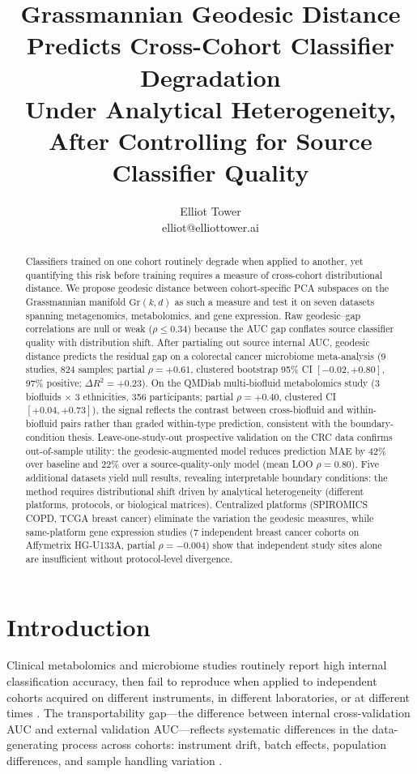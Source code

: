 \documentclass{article}
\title{Grassmannian Geodesic Distance Predicts Cross-Cohort Classifier Degradation\\Under Analytical Heterogeneity, After Controlling for Source Classifier Quality}
\author{\name Elliot Tower \\
      \email elliot@elliottower.ai}
\begin{document}
\maketitle

\begin{abstract}
Classifiers trained on one cohort routinely degrade when applied to another, yet quantifying this risk before training requires a measure of cross-cohort distributional distance. We propose geodesic distance between cohort-specific PCA subspaces on the Grassmannian manifold $\mathrm{Gr}(k, d)$ as such a measure and test it on seven datasets spanning metagenomics, metabolomics, and gene expression. Raw geodesic--gap correlations are null or weak ($\rho \leq 0.34$) because the AUC gap conflates source classifier quality with distribution shift. After partialing out source internal AUC, geodesic distance predicts the residual gap on a colorectal cancer microbiome meta-analysis (9 studies, 824 samples; partial $\rho = +0.61$, clustered bootstrap 95\% CI $[-0.02, +0.80]$, 97\% positive; $\Delta R^2 = +0.23$). On the QMDiab multi-biofluid metabolomics study (3 biofluids $\times$ 3 ethnicities, 356 participants; partial $\rho = +0.40$, clustered CI $[+0.04, +0.73]$), the signal reflects the contrast between cross-biofluid and within-biofluid pairs rather than graded within-type prediction, consistent with the boundary-condition thesis. Leave-one-study-out prospective validation on the CRC data confirms out-of-sample utility: the geodesic-augmented model reduces prediction MAE by 42\% over baseline and 22\% over a source-quality-only model (mean LOO $\rho = 0.80$). Five additional datasets yield null results, revealing interpretable boundary conditions: the method requires distributional shift driven by analytical heterogeneity (different platforms, protocols, or biological matrices). Centralized platforms (SPIROMICS COPD, TCGA breast cancer) eliminate the variation the geodesic measures, while same-platform gene expression studies (7 independent breast cancer cohorts on Affymetrix HG-U133A, partial $\rho = -0.004$) show that independent study sites alone are insufficient without protocol-level divergence.
\end{abstract}

\section{Introduction}

Clinical metabolomics and microbiome studies routinely report high internal classification accuracy, then fail to reproduce when applied to independent cohorts acquired on different instruments, in different laboratories, or at different times \citep{broadhurst2006statistical}. The transportability gap---the difference between internal cross-validation AUC and external validation AUC---reflects systematic differences in the data-generating process across cohorts: instrument drift, batch effects, population differences, and sample handling variation \citep{wehrens2016improved}.
\end{document}
